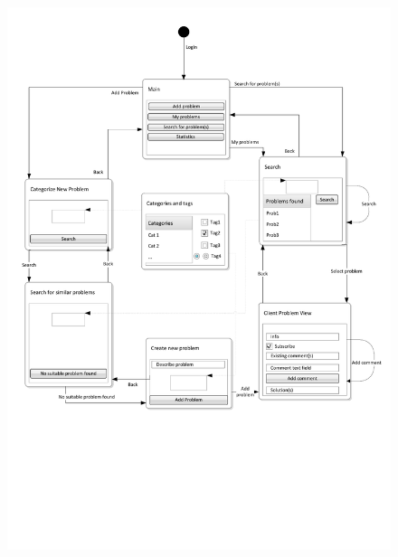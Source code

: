 \begin{figure}[htb]
\begin{center}
 \includegraphics[scale=0.70, clip=true, trim=0 6cm 0 0]{input/application_domain_analysis/client_interface}
\caption{\cinterface[]}
\label{fig:client_interface}
\end{center}
\end{figure}




